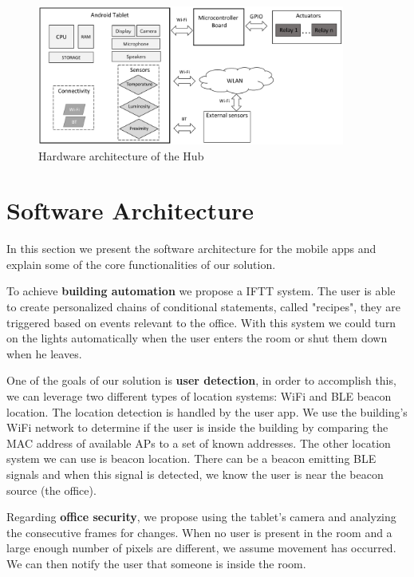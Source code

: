 \begin{figure}[h]
\centering
\includegraphics[width=0.9\textwidth]{Figures/arch_hardware}
\caption{Hardware architecture of the Hub}
\label{hard_architecture_system}
\end{figure}


\section{Software Architecture}\label{architecture4} 

In this section we present the software architecture for the mobile apps and explain some of the core functionalities of our solution.

To achieve \textbf{building automation} we propose a \ac{IFTT} system. The user is able to create personalized chains of conditional statements, called "recipes", they are triggered based on events relevant to the office. With this system we could turn on the lights automatically when the user enters the room or shut them down when he leaves.

One of the goals of our solution is \textbf{user detection}, in order to accomplish this, we can leverage two different types of location systems: \ac{WiFi} and \ac{BLE} beacon location. The location detection is handled by the user app. We use the building's \ac{WiFi} network to determine if the user is inside the building by comparing the \ac{MAC address} of available \ac{AP}s to a set of known addresses. The other location system we can use is beacon location. There can be a beacon emitting \ac{BLE} signals and when this signal is detected, we know the user is near the beacon source (the office).

Regarding \textbf{office security}, we propose using the tablet's camera and analyzing the consecutive frames for changes. When no user is present in the room and a large enough number of pixels are different, we assume movement has occurred. We can then notify the user that someone is inside the room.


